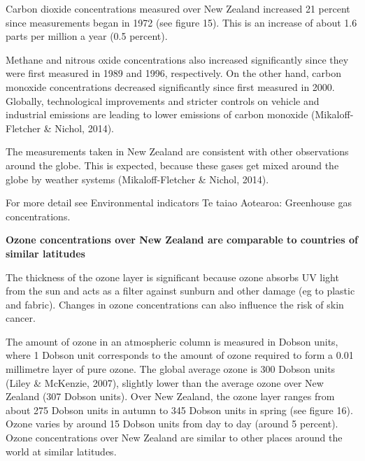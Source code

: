 \documentclass[11pt]{mfe-nzers} %
\begin{document}
Carbon dioxide concentrations measured over New Zealand increased 21 percent since measurements began in 1972 (see figure 15). This is an increase of about 1.6 parts per million a year (0.5 percent).


Methane and nitrous oxide concentrations also increased significantly since they were first measured in 1989 and 1996, respectively. On the other hand, carbon monoxide concentrations decreased significantly since first measured in 2000. Globally, technological improvements and stricter controls on vehicle and industrial emissions are leading to lower emissions of carbon monoxide (Mikaloff-Fletcher \& Nichol, 2014).

The measurements taken in New Zealand are consistent with other observations around the globe. This is expected, because these gases get mixed around the globe by weather systems (Mikaloff-Fletcher \& Nichol, 2014).

For more detail see Environmental indicators Te taiao Aotearoa: Greenhouse gas concentrations.

\textbf{Ozone concentrations over New Zealand are comparable to countries of similar latitudes}

The thickness of the ozone layer is significant because ozone absorbs UV light from the sun and acts as a filter against sunburn and other damage (eg to plastic and fabric). Changes in ozone concentrations can also influence the risk of skin cancer.

The amount of ozone in an atmospheric column is measured in Dobson units, where 1 Dobson unit corresponds to the amount of ozone required to form a 0.01 millimetre layer of pure ozone. The global average ozone is 300 Dobson units (Liley \& McKenzie, 2007), slightly lower than the average ozone over New Zealand (307 Dobson units). Over New Zealand, the ozone layer ranges from about 275 Dobson units in autumn to 345 Dobson units in spring (see figure 16). Ozone varies by around 15 Dobson units from day to day (around 5 percent). Ozone concentrations over New Zealand are similar to other places around the world at similar latitudes.
\end{document}
